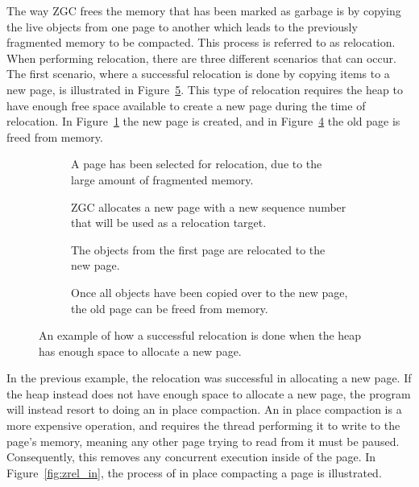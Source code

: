 The way ZGC frees the memory that has been marked as garbage is by copying the live objects from one page to another which leads to the previously fragmented memory to be compacted. This process is referred to as relocation. When performing relocation, there are three different scenarios that can occur. The first scenario, where a successful relocation is done by copying items to a new page, is illustrated in Figure~\ref{fig:zrel_new}. This type of relocation requires the heap to have enough free space available to create a new page during the time of relocation. In Figure~\ref*{fig:zrel_new1} the new page is created, and in Figure~\ref*{fig:zrel_new3} the old page is freed from memory.

\begin{figure}[H]
    \centering
    \begin{subfigure}[t]{.2\textwidth}
        \centering
        
        \caption{A page has been selected for relocation, due to the large amount of fragmented memory.}
        \label{fig:zrel_new1}
    \end{subfigure}%
    \hfill\vline\hfill
    \begin{subfigure}[t]{.2\textwidth}
        \centering
        
        \caption{ZGC allocates a new page with a new sequence number that will be used as a relocation target.}
        \label{fig:zrel_new2}
    \end{subfigure}%
    \hfill\vline\hfill
    \begin{subfigure}[t]{.2\textwidth}
        \centering
        
        \caption{The objects from the first page are relocated to the new page.}
        \label{fig:zrel_new3}
    \end{subfigure}%
    \hfill\vline\hfill
    \begin{subfigure}[t]{.2\textwidth}
        \centering
        
        \caption{Once all objects have been copied over to the new page, the old page can be freed from memory.}
        \label{fig:zrel_new3}
    \end{subfigure}%
    \caption{An example of how a successful relocation is done when the heap has enough space to allocate a new page.}
    \label{fig:zrel_new}
\end{figure}

In the previous example, the relocation was successful in allocating a new page. If the heap instead does not have enough space to allocate a new page, the program will instead resort to doing an in place compaction. An in place compaction is a more expensive operation, and requires the thread performing it to write to the page's memory, meaning any other page trying to read from it must be paused. Consequently, this removes any concurrent execution inside of the page. In Figure~\ref{fig:zrel_in}, the process of in place compacting a page is illustrated. 

